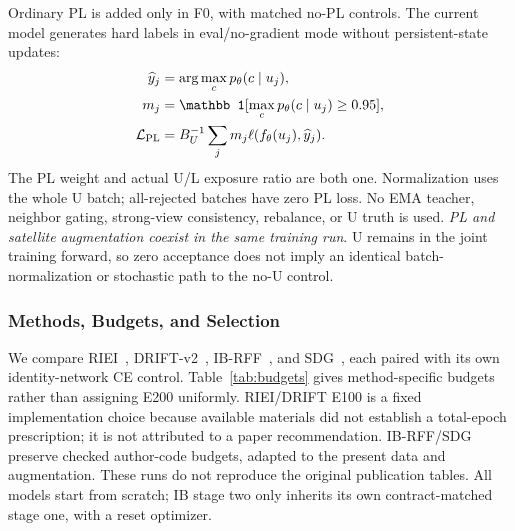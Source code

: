 Ordinary PL is added only in F0, with matched no-PL controls. The current model generates hard labels in eval/no-gradient mode without persistent-state updates:
\begin{equation}
\begin{aligned}
\widehat y_j&=\arg\max_c p_\theta(c\mid u_j),\\
m_j&=\mathbb 1[\max_c p_\theta(c\mid u_j)\geq0.95],\\
\mathcal L_{\rm PL}&=B_U^{-1}\sum_jm_j\ell(f_\theta(u_j),\widehat y_j).
\end{aligned}
\label{eq:pl}
\end{equation}
The PL weight and actual U/L exposure ratio are both one. Normalization uses the whole U batch; all-rejected batches have zero PL loss. No EMA teacher, neighbor gating, strong-view consistency, rebalance, or U truth is used. \emph{PL and satellite augmentation coexist in the same training run}. U remains in the joint training forward, so zero acceptance does not imply an identical batch-normalization or stochastic path to the no-U control.

\subsubsection{Methods, Budgets, and Selection}
We compare RIEI~\cite{riei}, DRIFT-v2~\cite{drift}, IB-RFF~\cite{ibrff}, and SDG~\cite{sdg}, each paired with its own identity-network CE control. Table~\ref{tab:budgets} gives method-specific budgets rather than assigning E200 uniformly. RIEI/DRIFT E100 is a fixed implementation choice because available materials did not establish a total-epoch prescription; it is not attributed to a paper recommendation. IB-RFF/SDG preserve checked author-code budgets, adapted to the present data and augmentation. These runs do not reproduce the original publication tables. All models start from scratch; IB stage two only inherits its own contract-matched stage one, with a reset optimizer.

